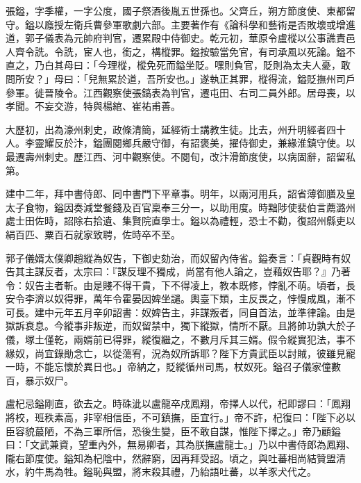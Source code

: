
\begin{pinyinscope}

 張鎰，字季權，一字公度，國子祭酒後胤五世孫也。父齊丘，朔方節度使、東都留守。鎰以廕授左衛兵曹參軍歌劇六部。主要著作有《論科學和藝術是否敗壞或增進道，郭子儀表為元帥府判官，遷累殿中侍御史。乾元初，華原令盧樅以公事譙責邑人齊令詵。令詵，宦人也，銜之，構樅罪。鎰按驗當免官，有司承風以死論。鎰不直之，乃白其母曰：「今理樅，樅免死而鎰坐貶。嘿則負官，貶則為太夫人憂，敢問所安？」母曰：「兒無累於道，吾所安也。」遂執正其罪，樅得流，鎰貶撫州司戶參軍。徙晉陵令。江西觀察使張鎬表為判官，遷屯田、右司二員外郎。居母喪，以孝聞。不妄交游，特與楊綰、崔祐甫善。



 大歷初，出為濠州刺史，政條清簡，延經術士講教生徒。比去，州升明經者四十人。李靈耀反於汴，鎰團閱鄉兵嚴守御，有詔褒美，擢侍御史，兼緣淮鎮守使。以最遷壽州刺史。歷江西、河中觀察使。不閱旬，改汴滑節度使，以病固辭，詔留私第。



 建中二年，拜中書侍郎、同中書門下平章事。明年，以兩河用兵，詔省薄御膳及皇太子食物，鎰因奏減堂餐錢及百官稟奉三分一，以助用度。時黜陟使裴伯言薦潞州處士田佐時，詔除右拾遺、集賢院直學士。鎰以為禮輕，恐士不勸，復詔州縣吏以絹百匹、粟百石就家致聘，佐時卒不至。



 郭子儀婿太僕卿趙縱為奴告，下御史劾治，而奴留內侍省。鎰奏言：「貞觀時有奴告其主謀反者，太宗曰：『謀反理不獨成，尚當有他人論之，豈藉奴告耶？』乃著令：奴告主者斬。由是賤不得干貴，下不得凌上，教本既修，悖亂不萌。頃者，長安令李濟以奴得罪，萬年令霍晏因婢坐譴。輿臺下類，主反畏之，悖慢成風，漸不可長。建中元年五月辛卯詔書：奴婢告主，非謀叛者，同自首法，並準律論。由是獄訴衰息。今縱事非叛逆，而奴留禁中，獨下縱獄，情所不厭。且將帥功孰大於子儀，塚土僅乾，兩婿前已得罪，縱復繼之，不數月斥其三婿。假令縱實犯法，事不緣奴，尚宜錄勛念亡，以從蕩宥，況為奴所訴耶？陛下方貴武臣以討賊，彼雖見寵一時，不能忘懷於異日也。」帝納之，貶縱循州司馬，杖奴死。鎰召子儀家僮數百，暴示奴尸。



 盧杞忌鎰剛直，欲去之。時硃泚以盧龍卒戍鳳翔，帝擇人以代，杞即謬曰：「鳳翔將校，班秩素高，非宰相信臣，不可鎮撫，臣宜行。」帝不許，杞復曰：「陛下必以臣容貌蕞陋，不為三軍所信，恐後生變，臣不敢自謀，惟陛下擇之。」帝乃顧鎰曰：「文武兼資，望重內外，無易卿者，其為朕撫盧龍士。」乃以中書侍郎為鳳翔、隴右節度使。鎰知為杞陰中，然辭窮，因再拜受詔。頃之，與吐蕃相尚結贊盟清水，約牛馬為牲。鎰恥與盟，將末殺其禮，乃紿語吐蕃，以羊豕犬代之。




\end{pinyinscope}
